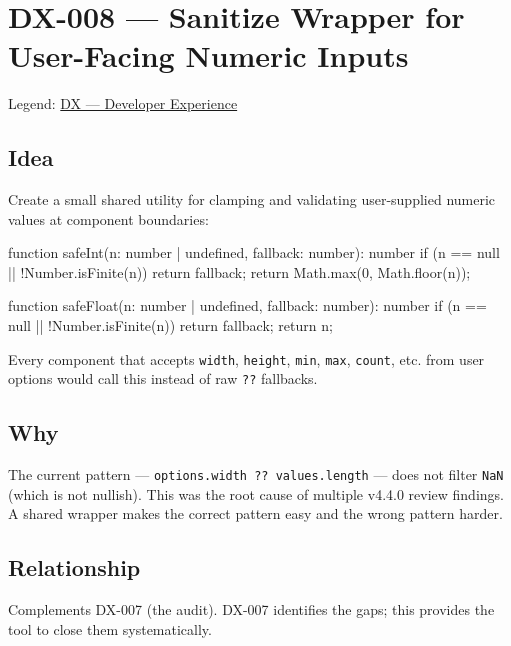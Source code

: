 \chapter{DX-008 --- Sanitize Wrapper for User-Facing Numeric Inputs}\label{record-312}

\smallskip

Legend: \href{https://github.com/flyingrobots/bijou/blob/cbd70612140e7a450d764b3c7be1c6af878b99bc/docs/method/graveyard/legends/DX-developer-experience.md}{DX --- Developer Experience}

\section{Idea}\label{record-312-idea}

Create a small shared utility for clamping and validating user-supplied numeric values at component boundaries:

\begin{CodeBlock}
function safeInt(n: number | undefined, fallback: number): number {
  if (n == null || !Number.isFinite(n)) return fallback;
  return Math.max(0, Math.floor(n));
}

function safeFloat(n: number | undefined, fallback: number): number {
  if (n == null || !Number.isFinite(n)) return fallback;
  return n;
}
\end{CodeBlock}

Every component that accepts \texttt{w\allowbreak{}i\allowbreak{}d\allowbreak{}t\allowbreak{}h}, \texttt{h\allowbreak{}e\allowbreak{}i\allowbreak{}g\allowbreak{}h\allowbreak{}t}, \texttt{m\allowbreak{}i\allowbreak{}n}, \texttt{m\allowbreak{}a\allowbreak{}x}, \texttt{c\allowbreak{}o\allowbreak{}u\allowbreak{}n\allowbreak{}t}, etc. from user options would call this instead of raw \texttt{?\allowbreak{}?} fallbacks.

\section{Why}\label{record-312-why}

The current pattern --- \texttt{o\allowbreak{}p\allowbreak{}t\allowbreak{}i\allowbreak{}o\allowbreak{}n\allowbreak{}s\allowbreak{}.\allowbreak{}w\allowbreak{}i\allowbreak{}d\allowbreak{}t\allowbreak{}h\allowbreak{} \allowbreak{}?\allowbreak{}?\allowbreak{} \allowbreak{}v\allowbreak{}a\allowbreak{}l\allowbreak{}u\allowbreak{}e\allowbreak{}s\allowbreak{}.\allowbreak{}l\allowbreak{}e\allowbreak{}n\allowbreak{}g\allowbreak{}t\allowbreak{}h} --- does not filter \texttt{N\allowbreak{}a\allowbreak{}N} (which is not nullish). This was the root cause of multiple v4.4.0 review findings. A shared wrapper makes the correct pattern easy and the wrong pattern harder.

\section{Relationship}\label{record-312-relationship}

Complements DX-007 (the audit). DX-007 identifies the gaps; this provides the tool to close them systematically.

